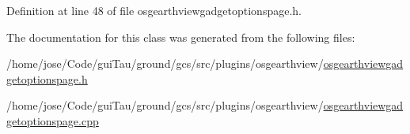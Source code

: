 Definition at line 48 of file osgearthviewgadgetoptionspage.\-h.



The documentation for this class was generated from the following files\-:\begin{DoxyCompactItemize}
\item 
/home/jose/\-Code/gui\-Tau/ground/gcs/src/plugins/osgearthview/\hyperlink{osgearthviewgadgetoptionspage_8h}{osgearthviewgadgetoptionspage.\-h}\item 
/home/jose/\-Code/gui\-Tau/ground/gcs/src/plugins/osgearthview/\hyperlink{osgearthviewgadgetoptionspage_8cpp}{osgearthviewgadgetoptionspage.\-cpp}\end{DoxyCompactItemize}
